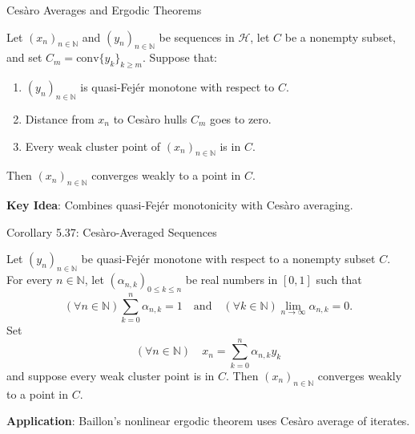 \documentclass[aspectratio=169,10pt]{beamer}
\begin{document}
\begin{frame}{Cesàro Averages and Ergodic Theorems}
    \begin{theorem}[Theorem 5.36]
        Let $(x_n)_{n \in \mathbb{N}}$ and $(y_n)_{n \in \mathbb{N}}$ be sequences in $\mathcal{H}$, let $C$ be a nonempty subset, and set $C_m = \text{conv}\{y_k\}_{k \geq m}$.
        Suppose that:
        \begin{enumerate}
            \item $(y_n)_{n \in \mathbb{N}}$ is quasi-Fejér monotone with respect to $C$.
            \item Distance from $x_n$ to Cesàro hulls $C_m$ goes to zero.
            \item Every weak cluster point of $(x_n)_{n \in \mathbb{N}}$ is in $C$.
        \end{enumerate}
        Then $(x_n)_{n \in \mathbb{N}}$ converges weakly to a point in $C$.
    \end{theorem}

    \vspace{0.3cm}

    \textbf{Key Idea}: Combines quasi-Fejér monotonicity with Cesàro averaging.
\end{frame}

\begin{frame}{Corollary 5.37: Cesàro-Averaged Sequences}
    \begin{corollary}[Corollary 5.37]
        Let $(y_n)_{n \in \mathbb{N}}$ be quasi-Fejér monotone with respect to a nonempty subset $C$.
        For every $n \in \mathbb{N}$, let $(\alpha_{n,k})_{0 \leq k \leq n}$ be real numbers in $[0, 1]$ such that
        \[
            (\forall n \in \mathbb{N}) \sum_{k=0}^n \alpha_{n,k} = 1 \quad \text{and} \quad (\forall k \in \mathbb{N}) \lim_{n \to \infty} \alpha_{n,k} = 0.
        \]
        Set
        \[
            (\forall n \in \mathbb{N}) \quad x_n = \sum_{k=0}^n \alpha_{n,k} y_k
        \]
        and suppose every weak cluster point is in $C$.
        Then $(x_n)_{n \in \mathbb{N}}$ converges weakly to a point in $C$.
    \end{corollary}

    \vspace{0.3cm}

    \textbf{Application}: Baillon's nonlinear ergodic theorem uses Cesàro average of iterates.
\end{frame}
\end{document}
